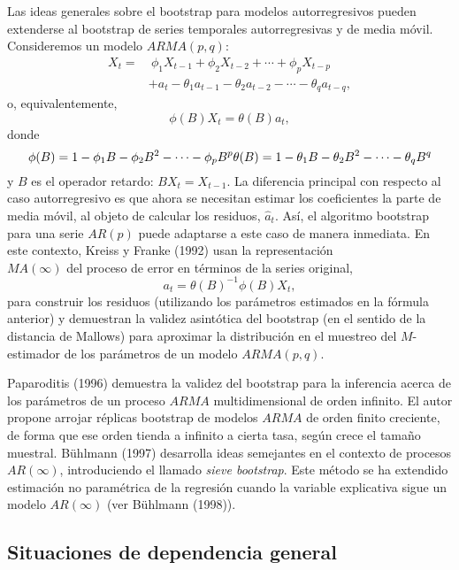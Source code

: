 \documentclass[
]{book}
\theoremstyle{break}
\theoremstyle{definition}
\theoremstyle{definition}
\theoremstyle{definition}
\theoremstyle{definition}
\theoremstyle{remark}
\begin{document}
Las ideas generales sobre el bootstrap para modelos autorregresivos
pueden extenderse al bootstrap de series temporales autorregresivas y de
media móvil. Consideremos un modelo \(ARMA(p,q)\): \[\begin{aligned}
X_{t} =&\ \phi _1X_{t-1}+\phi _2X_{t-2}+\cdots +\phi _{p}X_{t-p} \\
&+a_{t}-\theta _1a_{t-1}-\theta _2a_{t-2}-\cdots -\theta _{q}a_{t-q},\end{aligned}\]o,
equivalentemente,
\[\phi (B)X_{t}=\theta (B)a_{t},\]
donde
\[\phi (B)=1-\phi _1B-\phi _2B^2-\cdots -\phi _{p}B^{p}\\ 
\theta(B)=1-\theta _1B-\theta _2B^2-\cdots -\theta _{q}B^{q}\]
y \(B\) es el operador retardo: \(BX_{t}=X_{t-1}\).
La diferencia principal con
respecto al caso autorregresivo es que ahora se necesitan estimar los
coeficientes la parte de media móvil, al objeto de calcular los
residuos, \(\widehat{a}_{t}\).
Así, el algoritmo bootstrap para una serie \(AR(p)\) puede
adaptarse a este caso de manera inmediata.
En este contexto, Kreiss y Franke (1992) usan la representación\\
\(MA(\infty )\) del proceso de error en términos de la series original,
\[a_{t}=\theta (B)^{-1}\phi(B) X_{t},\]
para construir los residuos
(utilizando los parámetros estimados en la fórmula anterior) y demuestran
la validez asintótica del bootstrap (en el sentido de la distancia de Mallows)
para aproximar la distribución en el muestreo del \(M\)-estimador de los
parámetros de un modelo \(ARMA(p,q)\).

Paparoditis (1996) demuestra la validez del bootstrap para la inferencia
acerca de los parámetros de un proceso \(ARMA\) multidimensional de orden
infinito. El autor propone arrojar réplicas bootstrap de modelos \(ARMA\)
de orden finito creciente, de forma que ese orden tienda a infinito a
cierta tasa, según crece el tamaño muestral. Bühlmann (1997) desarrolla
ideas semejantes en el contexto de procesos \(AR\left( \infty \right)\),
introduciendo el llamado \emph{sieve bootstrap}. Este método se ha extendido
estimación no paramétrica de la regresión cuando la variable explicativa
sigue un modelo \(AR\left( \infty \right)\) (ver Bühlmann (1998)).

\hypertarget{situaciones-de-dependencia-general-1}{%
\subsection{Situaciones de dependencia general}\label{situaciones-de-dependencia-general-1}}
\end{document}

